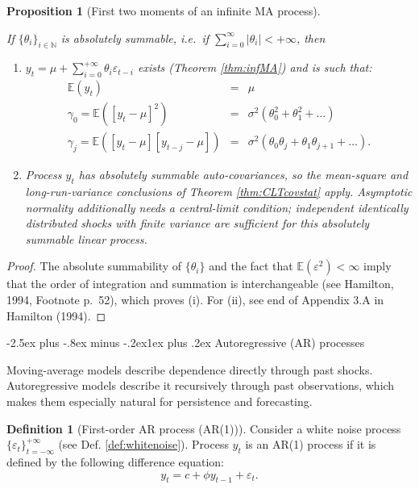 \documentclass[
  11pt,
]{book}
\makeatletter
\providecommand{\tightlist}{%
  \setlength{\itemsep}{0pt}\setlength{\parskip}{0pt}}
\renewcommand\subsection{\@startsection{subsection}{2}{\z@}
  {-2.5ex plus -.8ex minus -.2ex}{1ex plus .2ex}
  {\normalfont\large\bfseries\color{TextbookInk}}}
\newtheorem{proposition}{Proposition}[chapter]
\theoremstyle{definition}
\newtheorem{definition}{Definition}[chapter]
\theoremstyle{definition}
\theoremstyle{definition}
\theoremstyle{definition}
\theoremstyle{remark}
\makeatother
\begin{document}
\begin{proposition}[First two moments of an infinite MA process]
\protect\hypertarget{prp:momentsMAinf}{}\label{prp:momentsMAinf}

If \(\{\theta_{i}\}_{i\in\mathbb{N}}\) is absolutely summable, i.e.~if \(\sum_{i=0}^{\infty}|\theta_i| < + \infty\), then

\begin{enumerate}
\def\labelenumi{\roman{enumi}.}
\tightlist
\item
  \(y_t = \mu + \sum_{i=0}^{+\infty} \theta_{i} \varepsilon_{t-i}\) exists (Theorem \ref{thm:infMA}) and is such that:
  \begin{eqnarray*}
  \mathbb{E}(y_t) &=& \mu\\
  \gamma_0 = \mathbb{E}([y_t-\mu]^2) &=& \sigma^2(\theta_0^2 +\theta_1^2 + \dots)\\
  \gamma_j = \mathbb{E}([y_t-\mu][y_{t-j}-\mu]) &=& \sigma^2(\theta_0\theta_j + \theta_{1}\theta_{j+1} + \dots).
  \end{eqnarray*}
\item
  Process \(y_t\) has absolutely summable auto-covariances, so the mean-square and long-run-variance conclusions of Theorem \ref{thm:CLTcovstat} apply. Asymptotic normality additionally needs a central-limit condition; independent identically distributed shocks with finite variance are sufficient for this absolutely summable linear process.
\end{enumerate}

\end{proposition}

\begin{proof}
The absolute summability of \(\{\theta_{i}\}\) and the fact that \(\mathbb{E}(\varepsilon^2)<\infty\) imply that the order of integration and summation is interchangeable (see Hamilton, 1994, Footnote p.~52), which proves (i). For (ii), see end of Appendix 3.A in Hamilton (1994).
\end{proof}

\subsection{Autoregressive (AR) processes}\label{ARsection}

Moving-average models describe dependence directly through past shocks. Autoregressive models describe it recursively through past observations, which makes them especially natural for persistence and forecasting.

\begin{definition}[First-order AR process (AR(1))]
\protect\hypertarget{def:AR1}{}\label{def:AR1}Consider a white noise process \(\{\varepsilon_t\}_{t = -\infty}^{+\infty}\) (see Def. \ref{def:whitenoise}). Process \(y_t\) is an AR(1) process if it is defined by the following difference equation:
\[
y_t = c + \phi y_{t-1} + \varepsilon_t.
\]
\end{definition}
\end{document}
